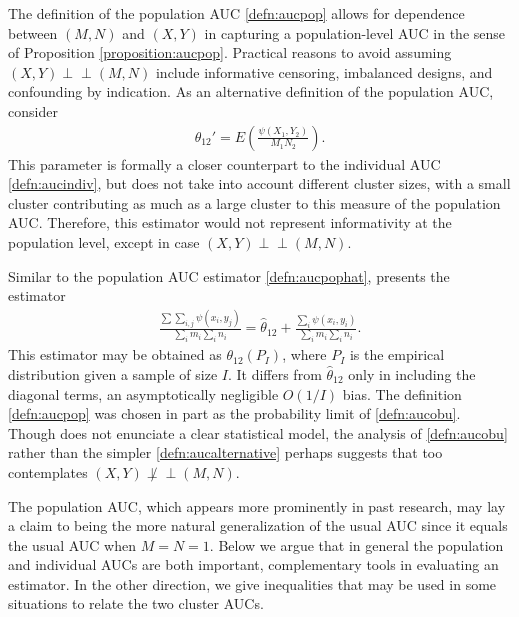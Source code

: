 \documentclass[12pt]{article}
\DeclareMathOperator{\AUC}{AUC}
\newcommand{\I}{I}
\newcommand{\E}{E}
\renewcommand{\P}{P}
\newcommand{\cind}{\perp \!\!\! \perp}
\newcommand{\aucpop}{\theta_{12}}%
\newcommand{\aucpophat}{\hat{\theta}_{12}}%
\newcommand{\comment}[1]{
  \iftoggle{commenttoggle}{
    {\normalsize{\color{red}{ #1}}\normalsize}
  }
  {}
}
\begin{document}
  The definition of the population AUC \eqref{defn:aucpop} allows for
  dependence between $(M,N)$ and $(X,Y)$ in capturing a
  population-level AUC in the sense of Proposition
  \ref{proposition:aucpop}. Practical reasons to avoid assuming
  $(X,Y)\cind (M,N)$ %
  include informative censoring, imbalanced designs, and confounding by indication. As an alternative definition of the population AUC,
  consider
  \begin{align}
  \aucpop'=\E\left(\frac{\psi(X_1,Y_2)}{M_1N_2} \right).\label{defn:aucalternative}
  \end{align}
  This parameter is formally a closer counterpart to the individual
  AUC \eqref{defn:aucindiv}, but does not take into account different
  cluster sizes, with a small cluster contributing as much as a large
  cluster to this measure of the population AUC.  Therefore, this
  estimator would not represent informativity at the population level,
  except in case $(X,Y)\cind (M,N)$.

  Similar to the population AUC estimator \eqref{defn:aucpophat}, \cite{obuchowski1997} presents the estimator
  \begin{align}
 \frac{\sum\sum_{i,
      j}\psi(x_i,y_j)}{\sum_im_i\sum_in_i} = \aucpophat +\frac{\sum_i\psi(x_i,y_i)}{\sum_im_i\sum_in_i}.\label{defn:aucobu}
  \end{align}
  This estimator may be obtained as $\aucpop(\P_{\I})$, where
  $\P_{\I}$ is the empirical distribution given a sample of size
  $\I$. It differs from $\aucpophat$ only in including the diagonal
  terms, an asymptotically negligible $O(1/\I)$ bias. The definition
  \eqref{defn:aucpop} was chosen in part as the probability limit of
  \eqref{defn:aucobu}. Though \cite{obuchowski1997} does not enunciate
  a clear statistical model, the analysis of \eqref{defn:aucobu}
  rather than the simpler \eqref{defn:aucalternative} perhaps suggests
  that \cite{obuchowski1997} too contemplates $(X,Y)\not\cind (M,N)$.




  The population AUC, which appears more prominently in past research,
  may lay a claim to being the more natural generalization of the
  usual AUC since it equals the usual AUC when $M=N=1$. Below we argue
  that in general the population and individual AUCs are both
  important, complementary tools in evaluating an estimator. In the
  other direction, we give inequalities that may be used in some
  situations to relate the two cluster AUCs.
\end{document}
